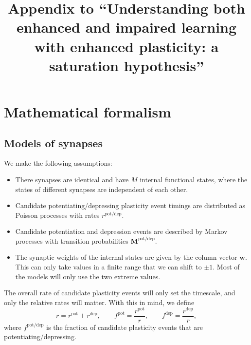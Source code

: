 \documentclass[10pt]{article}
\title{Appendix to ``Understanding both enhanced and impaired learning with enhanced plasticity: a saturation hypothesis''}
\date{}
\newcommand{\w}{\mathbf{w}}
\newcommand{\M}{\mathbf{M}}
\newcommand{\pot}{^{\text{pot}}}
\newcommand{\dep}{^{\text{dep}}}
\newcommand{\potdep}{^{\text{pot/dep}}}
\begin{document}
\maketitle







\section{Mathematical formalism}\label{sec:setup}


\subsection{Models of synapses}\label{sec:synapse}

We make the following assumptions:
\begin{itemize}
  \item There synapses are identical and have $M$ internal functional states, where the states of different synapses are independent of each other.
  \item Candidate potentiating/depressing plasticity event timings are distributed as Poisson processes with rates $r\potdep$.
  \item Candidate potentiation and depression events are described by Markov processes with transition probabilities $\M\potdep$.
  \item The synaptic weights of the internal states are given by the column vector $\w$. This can only take values in a finite range that we can shift to $\pm1$. Most of the models will only use the two extreme values.
\end{itemize}

The overall rate of candidate plasticity events will only set the timescale, and only the relative rates will matter.
With this in mind, we define
%
\begin{equation}\label{eq:fpotdep}
  r = r\pot + r\dep,
  \qquad
  f\pot = \frac{r\pot}{r},
  \qquad
  f\dep = \frac{r\dep}{r},
\end{equation}
%
where $f\potdep$ is the fraction of candidate plasticity events that are potentiating/depressing.
\end{document}
